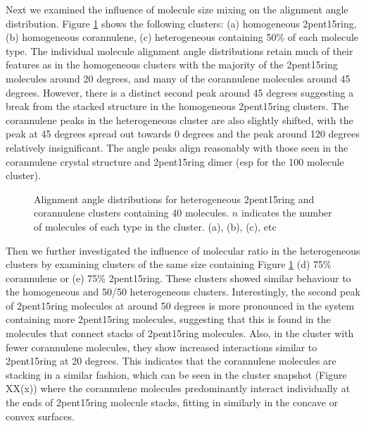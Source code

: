 Next we examined the influence of molecule size mixing on the alignment angle distribution.  Figure \ref{fig:alignmentangles_hetero} shows the following clusters: (a) homogeneous 2pent15ring, (b) homogeneous corannulene, (c) heterogeneous containing 50\% of each molecule type. The individual molecule alignment angle distributions retain much of their features as in the homogeneous clusters with the majority of the 2pent15ring molecules around 20 degrees, and many of the corannulene molecules around 45 degrees.  However, there is a distinct second peak around 45 degrees suggesting a break from the stacked structure in the homogeneous 2pent15ring clusters.  The corannulene peaks in the heterogeneous cluster are also slightly shifted, with the peak at 45 degrees spread out towards 0 degrees and the peak around 120 degrees relatively insignificant.
The angle peaks align reasonably with those seen in the corannulene crystal structure and 2pent15ring dimer (esp for the 100 molecule cluster).
%
\begin{figure}[!tbh]
\centering
\caption{Alignment angle distributions for heterogeneous 2pent15ring and corannulene clusters containing 40 molecules. $n$ indicates the number of molecules of each type in the cluster. (a), (b), (c), etc}
\label{fig:alignmentangles_hetero}
\end{figure}
%

Then we further investigated the influence of molecular ratio in the heterogeneous clusters by examining clusters of the same size containing Figure \ref{fig:alignmentangles_hetero} (d) 75\% corannulene or (e) 75\% 2pent15ring.  These clusters showed similar behaviour to the homogeneous and 50/50 heterogeneous clusters.  Interestingly, the second peak of 2pent15ring molecules at around 50 degrees is more pronounced in the system containing more 2pent15ring molecules, suggesting that this is found in the molecules that connect stacks of 2pent15ring molecules.  Also, in the cluster with fewer corannulene molecules, they show increased interactions similar to 2pent15ring at 20 degrees.  This indicates that the corannulene molecules are stacking in a similar fashion, which can be seen in the cluster snapshot (Figure XX(x)) where the corannulene molecules predominantly interact individually at the ends of 2pent15ring molecule stacks, fitting in similarly in the concave or convex surfaces.

